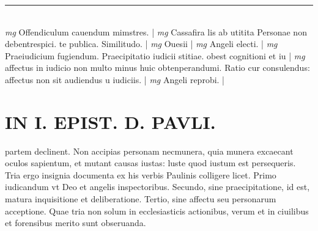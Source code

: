 \documentclass{article}
\begin{document}
\begin{pages}
\vspace{0.5cm}\noindent
\vspace{0.2cm}\rule{1cm}{0.2pt}\\ 
\hspace{0.2cm}\textit{mg}
\footnotesize Offendiculum cauendum mimstres. 
\normalsize| 
\hspace{0.2cm}\textit{mg}
\footnotesize Cassafira lis ab utitita Personae non debentrespici. te publica. Similitudo. 
\normalsize| 
\hspace{0.2cm}\textit{mg}
\footnotesize Ouesii
\normalsize| 
\hspace{0.2cm}\textit{mg}
\footnotesize Angeli electi. 
\normalsize| 
\hspace{0.2cm}\textit{mg}
\footnotesize Praeiudicium fugiendum. Praecipitatio iudicii stitiae. obest cognitioni et iu
\normalsize| 
\hspace{0.2cm}\textit{mg}
\footnotesize affectus in iudicio non multo minus huic obtenperandumi. Ratio cur consulendus: affectus non sit audiendus u iudiciis. 
\normalsize| 
\hspace{0.2cm}\textit{mg}
\footnotesize Angeli reprobi. 
\normalsize| 
\section*{IN I. EPIST. D. PAVLI. }
\marginpar{[ p.116 ]}\pstart partem declinent. Non accipias personam necmunera, quia munera excaecant oculos sapientum, et mutant causas iustas: luste quod iustum est persequeris. Tria ergo insignia documenta ex his verbis Paulinis colligere licet. Primo iudicandum vt Deo et angelis inspectoribus. Secundo, sine praecipitatione, id est, matura inquisitione et deliberatione. Tertio, sine affectu seu personarum acceptione. Quae tria non solum in ecclesiasticis actionibus, verum et in ciuilibus et forensibus merito sunt obseruanda.  \pend
{}
{}

\end{pages}
\end{document}
